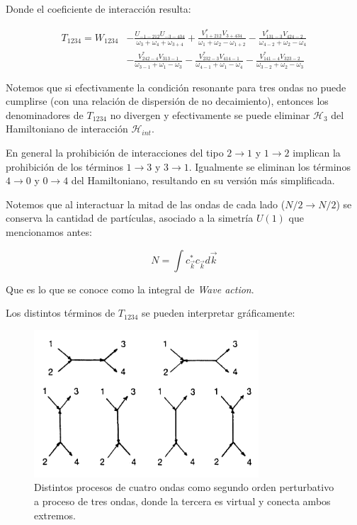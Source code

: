 Donde el coeficiente de interacción resulta:

\begin{align}
	T_{1234} = W_{1234} &-\frac{U_{-1-212}U_{-3-434}}{\omega_3+\omega_4+\omega_{3+4}} + \frac{V^*_{1+212}V_{3+434}}{\omega_1+\omega_2-\omega_{1+2}} 	-\frac{V^*_{131-3}V_{424-2}}{\omega_{4-2}+\omega_2-\omega_4} \\ 
	&- \frac{V^*_{242-4}V_{313-1}}{\omega_{3-1}+\omega_1-\omega_3} 
	-\frac{V^*_{232-3}V_{414-1}}{\omega_{4-1}+\omega_1-\omega_4}-\frac{V^*_{141-4}V_{323-2}}{\omega_{3-2}+\omega_2-\omega_3} 
\end{align} 

Notemos que si efectivamente la condición resonante para tres ondas no puede cumplirse (con una relación de dispersión de no decaimiento), entonces los denominadores de $T_{1234}$ no divergen y efectivamente se puede eliminar $\mathcal{H}_3$ del Hamiltoniano de interacción $\mathcal{H}_{int}$.

En general la prohibición de interacciones del tipo $2\rightarrow1$ y $1\rightarrow2$ implican la prohibición de los términos $1\rightarrow3$ y $3\rightarrow1$. Igualmente se eliminan los términos $4\rightarrow0$ y $0\rightarrow4$ del Hamiltoniano, resultando en su versión más simplificada.


Notemos que al interactuar la mitad de las ondas de cada lado ($N/2\rightarrow N/2$) se conserva la cantidad de partículas, asociado a la simetría $U(1)$ que mencionamos antes:

\begin{equation}
	N = \int c^*_{\vec k}c_{\vec k} d\vec k
\end{equation}

Que es lo que se conoce como la integral de \textit{Wave action}.


Los distintos términos de $T_{1234}$ se pueden interpretar gráficamente:

\begin{figure}[!ht]
	\centering
	\includegraphics[width=0.7\linewidth]{Figures/Antecedentes_teoricos/Procesos_de_4_ondas}
	\caption{Distintos procesos de cuatro ondas como segundo orden perturbativo a proceso de tres ondas, donde la tercera es virtual y conecta ambos extremos. } %
	\label{fig:procesosde4ondas}
\end{figure}


